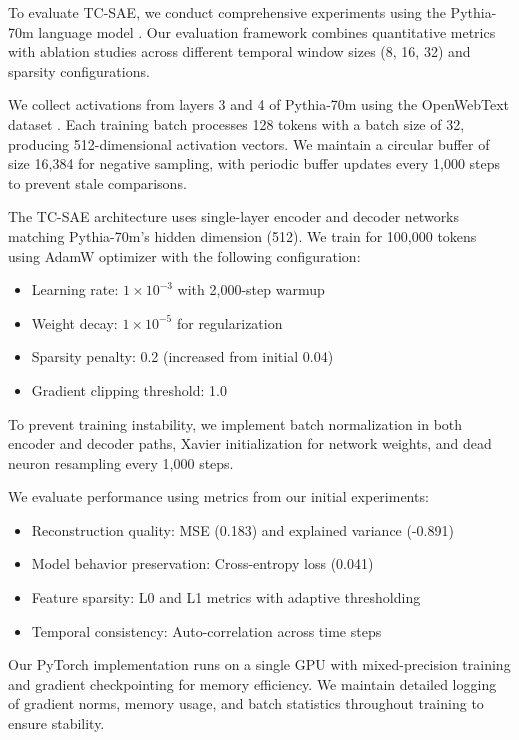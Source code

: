 \documentclass{article} %
\begin{document}
To evaluate TC-SAE, we conduct comprehensive experiments using the Pythia-70m language model \cite{radford2019language}. Our evaluation framework combines quantitative metrics with ablation studies across different temporal window sizes (8, 16, 32) and sparsity configurations.

We collect activations from layers 3 and 4 of Pythia-70m using the OpenWebText dataset \cite{radford2019language}. Each training batch processes 128 tokens with a batch size of 32, producing 512-dimensional activation vectors. We maintain a circular buffer of size 16,384 for negative sampling, with periodic buffer updates every 1,000 steps to prevent stale comparisons.

The TC-SAE architecture uses single-layer encoder and decoder networks matching Pythia-70m's hidden dimension (512). We train for 100,000 tokens using AdamW optimizer \cite{loshchilov2017adamw} with the following configuration:
\begin{itemize}
    \item Learning rate: $1\times10^{-3}$ with 2,000-step warmup
    \item Weight decay: $1\times10^{-5}$ for regularization
    \item Sparsity penalty: 0.2 (increased from initial 0.04)
    \item Gradient clipping threshold: 1.0
\end{itemize}

To prevent training instability, we implement batch normalization \cite{ba2016layer} in both encoder and decoder paths, Xavier initialization for network weights, and dead neuron resampling every 1,000 steps.

We evaluate performance using metrics from our initial experiments:
\begin{itemize}
    \item Reconstruction quality: MSE (0.183) and explained variance (-0.891)
    \item Model behavior preservation: Cross-entropy loss (0.041)
    \item Feature sparsity: L0 and L1 metrics with adaptive thresholding
    \item Temporal consistency: Auto-correlation across time steps
\end{itemize}

Our PyTorch \cite{paszke2019pytorch} implementation runs on a single GPU with mixed-precision training and gradient checkpointing for memory efficiency. We maintain detailed logging of gradient norms, memory usage, and batch statistics throughout training to ensure stability.
\end{document}
